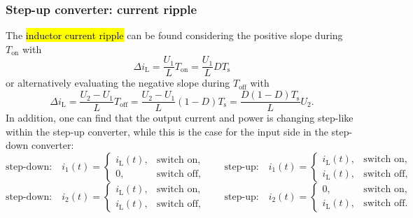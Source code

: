 \begin{frame}
    \frametitle{Step-up converter: current ripple}
    The \hl{inductor current ripple} can be found considering the positive slope during $T_\mathrm{on}$ with
    \begin{equation}
        \Delta i_\mathrm{L} = \frac{U_1}{L}T_\mathrm{on} = \frac{U_1}{L}DT_\mathrm{s}
        \label{eq:current-ripple-simple-step-up-pos}
    \end{equation}
    or alternatively evaluating the negative slope during $T_\mathrm{off}$ with
    \begin{equation}
        \Delta i_\mathrm{L} = \frac{U_2-U_1}{L}T_\mathrm{off} = \frac{U_2-U_1}{L}(1-D)T_\mathrm{s}=\frac{D(1-D)T_\mathrm{s}}{L}U_2.
        \label{eq:current-ripple-simple-step-up-neg}
    \end{equation}
    In addition, one can find that the output current and power is changing step-like within the step-up converter, while this is the case for the input side in the step-down converter: 
    \begin{equation*}
        \mbox{step-down:} \quad i_1(t) = \begin{cases}
            i_\mathrm{L}(t), & \mbox{switch on},\\
            0, & \mbox{switch off},
        \end{cases}
        \qquad
        \mbox{step-up:} \quad i_1(t) = \begin{cases}
            i_\mathrm{L}(t), & \mbox{switch on},\\
            i_\mathrm{L}(t), & \mbox{switch off},
        \end{cases}
    \end{equation*}
    \begin{equation*}
        \mbox{step-down:} \quad i_2(t) = \begin{cases}
            i_\mathrm{L}(t), & \mbox{switch on},\\
            i_\mathrm{L}(t), & \mbox{switch off},
        \end{cases}
        \qquad
        \mbox{step-up:} \quad i_2(t) = \begin{cases}
            0, & \mbox{switch on},\\
            i_\mathrm{L}(t), & \mbox{switch off}.
        \end{cases}
    \end{equation*}
\end{frame}

